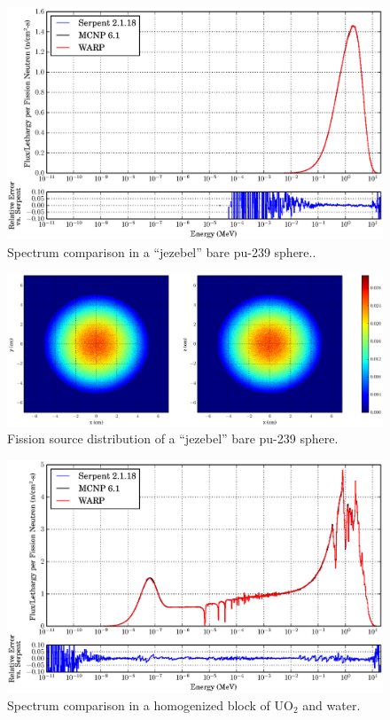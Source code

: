 \begin{figure}[h!] 
\centering
\includegraphics[width=\textwidth]{graphics/finalresults/godiva_spec-6.eps}
\caption{Spectrum comparison in a ``jezebel'' bare pu-239 sphere.. \label{godiva_spec} }
\end{figure}

\begin{figure}[h!]
\centering
\includegraphics[width=\textwidth,trim= 2cm 0cm 2cm 0cm]{graphics/finalresults/godiva_fiss-6.eps}
\caption{Fission source distribution of a ``jezebel'' bare pu-239 sphere. \label{godiva_fiss} }
\end{figure}

\begin{figure}[h!] 
\centering
\includegraphics[width=\textwidth]{graphics/finalresults/homfuel_spec-6.eps}
\caption{Spectrum comparison in a homogenized block of UO$_2$ and water. \label{homfuel_spec} }
\end{figure}


